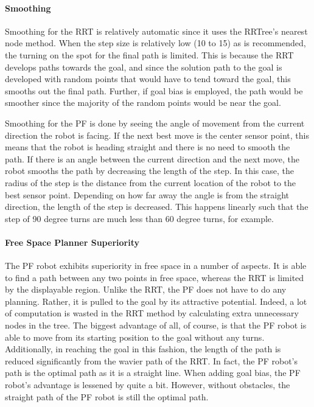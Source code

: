 \documentclass[12pt]{article}
\begin{document}
\paragraph*{Smoothing}
Smoothing for the RRT is relatively automatic since it uses the RRTree's nearest node method. When the step size is relatively low (10 to 15) as is recommended, the turning on the spot for the final path is limited. This is because the RRT develops paths towards the goal, and since the solution path to the goal is developed with random points that would have to tend toward the goal, this smooths out the final path. Further, if goal bias is employed, the path would be smoother since the majority of the random points would be near the goal.

Smoothing for the PF is done by seeing the angle of movement from the current direction the robot is facing. If the next best move is the center sensor point, this means that the robot is heading straight and there is no need to smooth the path. If there is an angle between the current direction and the next move, the robot smooths the path by decreasing the length of the step. In this case, the radius of the step is the distance from the current location of the robot to the best sensor point. Depending on how far away the angle is from the straight direction, the length of the step is decreased. This happens linearly such that the step of 90 degree turns are much less than 60 degree turns, for example.

\paragraph*{Free Space Planner Superiority}
The PF robot exhibits superiority in free space in a number of aspects. It is able to find a path between any two points in free space, whereas the RRT is limited by the displayable region. Unlike the RRT, the PF does not have to do any planning. Rather, it is pulled to the goal by its attractive potential. Indeed, a lot of computation is wasted in the RRT method by calculating extra unnecessary nodes in the tree. The biggest advantage of all, of course, is that the PF robot is able to move from its starting position to the goal without any turns. Additionally, in reaching the goal in this fashion, the length of the path is reduced significantly from the wavier path of the RRT. In fact, the PF robot's path is the optimal path as it is a straight line. When adding goal bias, the PF robot's advantage is lessened by quite a bit. However, without obstacles, the straight path of the PF robot is still the optimal path.
\end{document}
